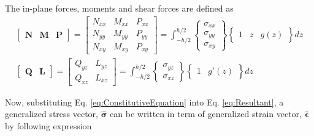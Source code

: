 \documentclass[3p,preprint,12pt]{elsarticle}
\begin{document}
The in-plane forces, moments and shear forces are defined as
\begin{equation} \label{eq:Resultant}
\begin{gathered}
\left[ \begin{array}{ccc}
\boldsymbol{N} & \boldsymbol{M} & \boldsymbol{P}
\end{array} \right] =
\left[\begin{array}{ccc}
N_{xx} & M_{xx} & P_{xx}\\
N_{yy} & M_{yy} & P_{yy}\\
N_{xy} & M_{xy} & P_{xy}
\end{array}\right]=\int_{-h/2}^{h/2}\left\{ \begin{array}{c}
\sigma_{xx}\\
\sigma_{yy}\\
\sigma_{xy}
\end{array}\right\}
\left\{ \begin{array}{ccc}
1 & z & g\left(z\right)\end{array}\right\}
dz
\\
\left[ \begin{array}{cc}
\boldsymbol{Q} & \boldsymbol{L}
\end{array} \right] =
\left[\begin{array}{cc}
Q_{yz} & L_{yz}\\
Q_{xz} & L_{xz}
\end{array}\right]=\int_{-h/2}^{h/2}\left\{ \begin{array}{c}
\sigma_{yz}\\
\sigma_{xz}
\end{array}\right\} 
\left\{\begin{array}{cc}
1 & g'\left(z\right)\end{array}\right\}
dz
\end{gathered}
\end{equation}

Now, substituting Eq. \cref{eq:ConstitutiveEquation} into Eq. \cref{eq:Resultant}, a generalized stress vector, $\boldsymbol{\hat{\sigma}}$ can be written in term of generalized strain vector, $\boldsymbol{\hat{\epsilon}}$ by following expression
\end{document}
